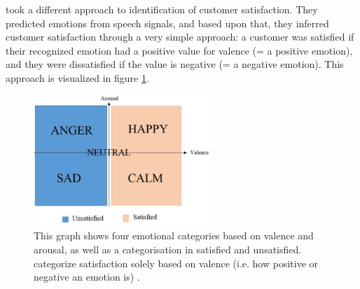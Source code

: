\newline\newline \citet{Kamaruddin:2016:MeasuringCustomerSatisfaction} took a different approach to identification of customer satisfaction. They predicted emotions from speech signals, and based upon that, they inferred customer satisfaction through a very simple approach: a customer was satisfied if their recognized emotion had a positive value for valence (= a positive emotion), and they were dissatisfied if the value is negative (= a negative emotion). This approach is visualized in figure \ref{fig:SatisfactionFromVA}.\newline

\begin{figure}[htpb]
  \begin{center}
  \includegraphics[angle=0, width=0.6\textwidth]{Figures/Satisfaction_from_VA.PNG}
  \caption[Interpretation of emotions]{This graph shows four emotional categories based on valence and arousal, as well as a categorisation in satisfied and unsatisfied. \citet{Kamaruddin:2016:MeasuringCustomerSatisfaction} categorize satisfaction solely based on valence (i.e. how positive or negative an emotion is) .}
  \label{fig:SatisfactionFromVA}
  \end{center}
\end{figure}

